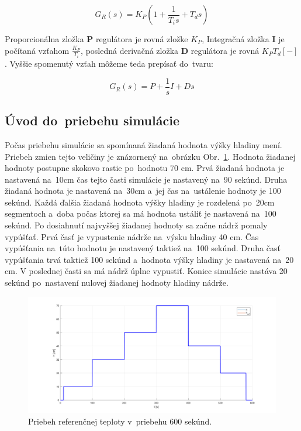 \documentclass{article}
\begin{document}
$$ G_R(s) = K_P \left( 1 + \frac{1}{T_is} + T_ds \right) $$

Proporcionálna zložka \textbf{P} regulátora je rovná zložke $K_P$, Integračná zložka \textbf{I} je počítaná vzťahom
$\frac{K_P}{T_i}$, posledná derivačná zložka \textbf{D} regulátora je rovná $K_P T_d [-]$.
Vyššie spomenutý vzťah môžeme teda prepísať do~tvaru:

$$ G_R(s) = P  + \frac{1}{s}I + Ds $$

\clearpage

\subsection{Úvod do~priebehu simulácie}
\label{subsec:priebehSimulacie}

Počas priebehu simulácie sa spomínaná žiadaná hodnota výšky hladiny mení. Priebeh zmien tejto veličiny je znázornený
na~obrázku Obr.~\ref{fig:ziadanaHodnota}. Hodnota žiadanej hodnoty postupne skokovo rastie po~hodnotu 70 cm. Prvá
žiadaná hodnota je nastavená na~10cm čas tejto časti simulácie je nastavený na~90 sekúnd. Druha žiadaná hodnota
je nastavená na~30cm a~jej čas na~ustálenie hodnoty je 100 sekúnd. Každá ďalšia žiadaná hodnota výšky hladiny
je rozdelená po~20cm segmentoch a~doba počas ktorej sa má hodnota ustáliť je nastavená na~100 sekúnd. Po dosiahnutí
najvyššej žiadanej hodnoty sa začne nádrž pomaly vypúšťať. Prvá časť je vypustenie nádrže na~výsku hladiny 40 cm.
Čas vypúšťania na~túto hodnotu je nastavený taktiež na~100 sekúnd. Druha časť vypúšťania trvá taktiež 100 sekúnd
a~hodnota výšky hladiny je nastavená na~20 cm. V poslednej časti sa má nádrž úplne vypustiť. Koniec simulácie nastáva
20 sekúnd po~nastavení nulovej žiadanej hodnoty hladiny nádrže.

\begin{figure}[!htbp]
	\begin{center}
		\includegraphics[width=\textwidth]{./include/ziadana_hodnota.png}
		\caption{Priebeh referenčnej teploty v~priebehu 600 sekúnd.}
		\label{fig:ziadanaHodnota}
	\end{center}
	\hfill
\end{figure}
\end{document}
